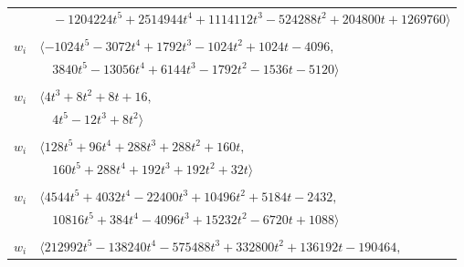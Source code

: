 \documentclass[11pt]{article}
\begin{document}
\begin{longtable}{@{}ll@{}}
 & $\quad -1204224t^{5}+2514944t^{4}+1114112t^{3}-524288t^{2}+204800t+1269760\rangle$\\
\addlinespace[2pt]
\multicolumn{2}{@{}p{0.97\textwidth}@{}}{$i=52$, $D_i=256$, $\rho_{ij}$: $1{:}1, \allowbreak 2{:}1, \allowbreak 4{:}1, \allowbreak 7{:}1, \allowbreak 12{:}1, \allowbreak 22{:}2, \allowbreak 25{:}1, \allowbreak 31{:}2, \allowbreak 37{:}2, \allowbreak 47{:}2, \allowbreak 61{:}2$}\\
$w_i$ & $\langle -1024t^{5}-3072t^{4}+1792t^{3}-1024t^{2}+1024t-4096,$\\
 & $\quad 3840t^{5}-13056t^{4}+6144t^{3}-1792t^{2}-1536t-5120\rangle$\\
\addlinespace[2pt]
\multicolumn{2}{@{}p{0.97\textwidth}@{}}{$i=53$, $D_i=4$, $\rho_{ij}$: $5{:}2, \allowbreak 6{:}2, \allowbreak 11{:}1, \allowbreak 27{:}1, \allowbreak 28{:}2, \allowbreak 43{:}1, \allowbreak 45{:}1, \allowbreak 58{:}1$}\\
$w_i$ & $\langle 4t^{3}+8t^{2}+8t+16,$\\
 & $\quad 4t^{5}-12t^{3}+8t^{2}\rangle$\\
\addlinespace[2pt]
\multicolumn{2}{@{}p{0.97\textwidth}@{}}{$i=54$, $D_i=32$, $\rho_{ij}$: $17{:}1, \allowbreak 24{:}1, \allowbreak 43{:}1, \allowbreak 55{:}1, \allowbreak 57{:}2, \allowbreak 63{:}2$}\\
$w_i$ & $\langle 128t^{5}+96t^{4}+288t^{3}+288t^{2}+160t,$\\
 & $\quad 160t^{5}+288t^{4}+192t^{3}+192t^{2}+32t\rangle$\\
\addlinespace[2pt]
\multicolumn{2}{@{}p{0.97\textwidth}@{}}{$i=55$, $D_i=64$, $\rho_{ij}$: $1{:}2, \allowbreak 14{:}2, \allowbreak 15{:}1, \allowbreak 17{:}1, \allowbreak 19{:}1, \allowbreak 27{:}1, \allowbreak 32{:}1, \allowbreak 33{:}2, \allowbreak 45{:}2, \allowbreak 54{:}2$}\\
$w_i$ & $\langle 4544t^{5}+4032t^{4}-22400t^{3}+10496t^{2}+5184t-2432,$\\
 & $\quad 10816t^{5}+384t^{4}-4096t^{3}+15232t^{2}-6720t+1088\rangle$\\
\addlinespace[2pt]
\multicolumn{2}{@{}p{0.97\textwidth}@{}}{$i=56$, $D_i=1024$, $\rho_{ij}$: $5{:}1, \allowbreak 7{:}1, \allowbreak 10{:}2, \allowbreak 19{:}1, \allowbreak 21{:}2, \allowbreak 22{:}1, \allowbreak 23{:}2, \allowbreak 27{:}1, \allowbreak 28{:}2, \allowbreak 31{:}1, \allowbreak 39{:}2, \allowbreak 44{:}1, \allowbreak 48{:}2$}\\
$w_i$ & $\langle 212992t^{5}-138240t^{4}-575488t^{3}+332800t^{2}+136192t-190464,$\\

\end{longtable}
\end{document}
